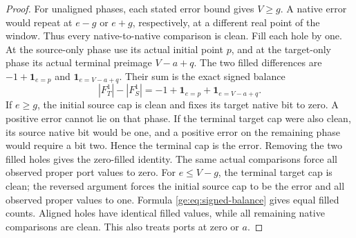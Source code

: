\documentclass[11pt,a4paper]{amsart}
\numberwithin{equation}{section}
\theoremstyle{plain}
\theoremstyle{definition}
\newcommand{\one}{\mathbf1}
\begin{document}
\begin{proof}
For unaligned phases, each stated error bound gives \(V\ge g\).  A native error would repeat at
\(e-g\) or \(e+g\), respectively, at a different real point of the
window.  Thus every native-to-native comparison is clean.  Fill each
hole by one.  At the source-only phase use its actual initial point
\(p\), and at the target-only phase its actual terminal preimage
\(V-a+q\).  The two filled differences are
\(-1+\one_{e=p}\) and \(\one_{e=V-a+q}\).  Their sum is the exact
signed balance
\begin{equation}\label{ge:eq:signed-balance}
 |F_T^1|-|F_S^1|=-1+\one_{e=p}+\one_{e=V-a+q}.
\end{equation}
If \(e\ge g\), the initial source cap is clean and fixes its target
native bit to zero.  A positive error cannot lie on that phase.  If
the terminal target cap were also clean, its source native bit would
be one, and a positive error on the remaining phase would require a
bit two.  Hence the terminal cap is the error.  Removing the two filled
holes gives the zero-filled identity.  The same actual comparisons
force all observed proper port values to zero.  For \(e\le V-g\),
the terminal target cap is clean; the reversed argument forces the
initial source cap to be the error and all observed proper values to
one.  Formula \eqref{ge:eq:signed-balance} gives equal filled counts.
Aligned holes have identical filled values, while all remaining native
comparisons are clean.  This also treats ports at zero or \(a\).
\end{proof}
\end{document}
